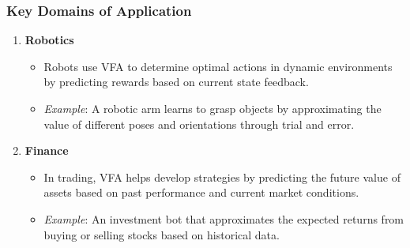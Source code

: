 \documentclass[aspectratio=169]{beamer}
\begin{document}
\begin{frame}[fragile]
    \frametitle{Key Domains of Application}
    \begin{enumerate}
        \item \textbf{Robotics}
            \begin{itemize}
                \item Robots use VFA to determine optimal actions in dynamic environments by predicting rewards based on current state feedback.
                \item \textit{Example}: A robotic arm learns to grasp objects by approximating the value of different poses and orientations through trial and error.
            \end{itemize}
        \item \textbf{Finance}
            \begin{itemize}
                \item In trading, VFA helps develop strategies by predicting the future value of assets based on past performance and current market conditions.
                \item \textit{Example}: An investment bot that approximates the expected returns from buying or selling stocks based on historical data.
            \end{itemize}
    \end{enumerate}
\end{frame}
\end{document}
